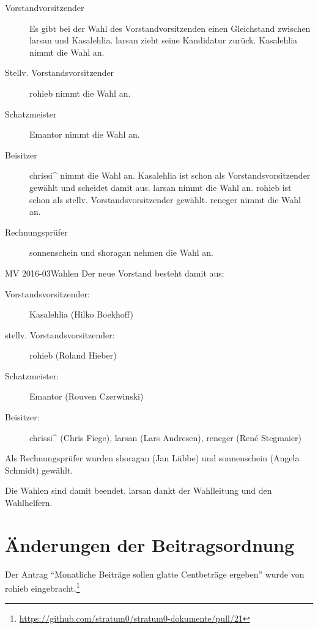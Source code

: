 \documentclass[parskip=half-]{s0minutes}
\begin{document}
\begin{description}
	\item[Vorstandvorsitzender] Es gibt bei der Wahl des Vorstandvorsitzenden
		einen Gleichstand zwischen larsan und Kasalehlia. larsan zieht seine
		Kandidatur zurück. Kasalehlia nimmt die Wahl an.
	\item[Stellv. Vorstandsvorsitzender] rohieb nimmt die Wahl an.
	\item[Schatzmeister] Emantor nimmt die Wahl an.
	\item[Beisitzer] chrissi\^{} nimmt die Wahl an. Kasalehlia ist schon als
		Vorstandsvorsitzender gewählt und scheidet damit aus. larsan nimmt die Wahl
		an.  rohieb ist schon als stellv. Vorstandsvorsitzender gewählt. reneger
		nimmt die Wahl an.
	\item[Rechnungsprüfer] sonnenschein und shoragan nehmen die Wahl an.
\end{description}

\begin{resolution}{MV 2016-03}{}{Wahlen}{}
Der neue Vorstand besteht damit aus:
\begin{description}
	\item[Vorstandsvorsitzender:] Kasalehlia (Hilko Boekhoff)
	\item[stellv. Vorstandsvorsitzender:] rohieb (Roland Hieber)
	\item[Schatzmeister:] Emantor (Rouven Czerwinski)
	\item[Beisitzer:] chrissi\^{} (Chris Fiege), larsan (Lars Andresen), reneger
		(René Stegmaier)
\end{description}

Als Rechnungsprüfer wurden shoragan (Jan Lübbe) und sonnenschein (Angela
Schmidt) gewählt.
\end{resolution}

Die Wahlen sind damit beendet. larsan dankt der Wahlleitung und den Wahlhelfern.

\section{Änderungen der Beitragsordnung}

Der Antrag "`Monatliche Beiträge sollen glatte Centbeträge ergeben"' wurde von
rohieb
eingebracht.\footnote{\url{https://github.com/stratum0/stratum0-dokumente/pull/21}}
\end{document}
